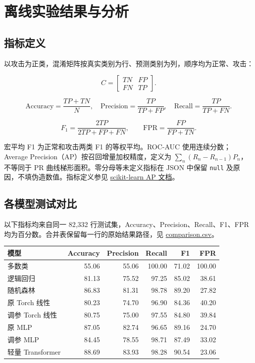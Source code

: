 \documentclass[UTF8,a4paper,11pt,fontset=fandol]{ctexart}
\newcounter{none}
\begin{document}
\section{离线实验结果与分析}\label{ux79bbux7ebfux5b9eux9a8cux7ed3ux679cux4e0eux5206ux6790}

\subsection{指标定义}\label{ux6307ux6807ux5b9aux4e49}

以攻击为正类，混淆矩阵按真实类别为行、预测类别为列，顺序均为正常、攻击：

\[C=\begin{bmatrix}TN&FP\\FN&TP\end{bmatrix}.\]

\[\mathrm{Accuracy}=\frac{TP+TN}{N},\quad
\mathrm{Precision}=\frac{TP}{TP+FP},\quad
\mathrm{Recall}=\frac{TP}{TP+FN}.\]

\[F_1=\frac{2TP}{2TP+FP+FN},\qquad \mathrm{FPR}=\frac{FP}{FP+TN}.\]

宏平均 F1 为正常和攻击两类 F1 的等权平均。ROC-AUC 使用连续分数；Average
Precision（AP）按召回增量加权精度，定义为
\(\sum_n(R_n-R_{n-1})P_n\)，不等同于 PR
曲线梯形面积。零分母等未定义指标在 JSON 中保留 \texttt{null}
及原因，不填伪造数值。指标定义参见
\href{https://scikit-learn.org/stable/modules/generated/sklearn.metrics.average_precision_score.html}{scikit-learn
AP 文档}。

\subsection{各模型测试对比}\label{ux5404ux6a21ux578bux6d4bux8bd5ux5bf9ux6bd4}

以下指标均来自同一 82,332 行测试集，Accuracy、Precision、Recall、F1、FPR
均为百分数。合并表保留每一行的原始结果路径，见
\href{https://github.com/ZureTz/ml-network-intrusion-detection/blob/master/reports/final/comparison.csv}{comparison.csv}。


{\def\LTcaptype{none} %
\begin{longtable}[]{@{}lrrrrr@{}}
\toprule\noalign{}
模型 & Accuracy & Precision & Recall & F1 & FPR \\
\midrule\noalign{}
\endhead
\bottomrule\noalign{}
\endlastfoot
多数类 & 55.06 & 55.06 & 100.00 & 71.02 & 100.00 \\
逻辑回归 & 81.13 & 75.52 & 97.25 & 85.02 & 38.61 \\
随机森林 & 86.83 & 81.31 & 98.78 & 89.20 & 27.82 \\
原 Torch 线性 & 80.23 & 74.70 & 96.90 & 84.36 & 40.20 \\
调参 Torch 线性 & 80.75 & 75.00 & 97.55 & 84.80 & 39.84 \\
原 MLP & 87.05 & 82.74 & 96.65 & 89.16 & 24.70 \\
调参 MLP & 84.45 & 78.55 & 98.71 & 87.49 & 33.02 \\
轻量 Transformer & 88.69 & 83.93 & 98.28 & 90.54 & 23.06 \\
\end{longtable}
}
\end{document}
